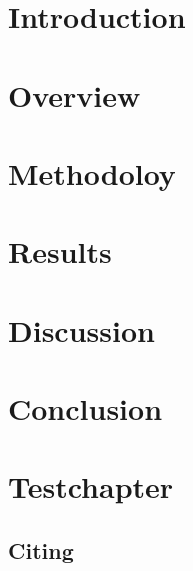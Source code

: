 \documentclass[a4paper, english]{ttlab-qualify}
\begin{document}
    \cleardoubleoddpage


    \chapter{Introduction}

    \chapter{Overview}
    \label{ch:overview}
    


    \chapter{Methodoloy}
    \label{ch:methodology}
    


    \chapter{Results}
    \label{ch:results}


    \chapter{Discussion}
    \label{ch:discussion}

    \chapter{Conclusion}
    \label{ch:conclusion}

    \chapter{\latex Testchapter}
    \section{Citing}
    ~\cite{GERPARCOR}
\end{document}
